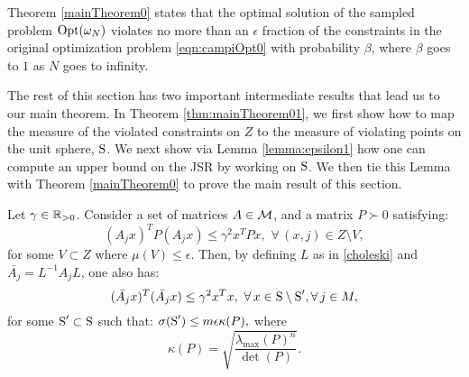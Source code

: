 Theorem \ref{mainTheorem0} states that the optimal solution of the sampled problem $\text{Opt}(\omega_N)$ violates no more than an $\epsilon$ fraction of the constraints in the original optimization problem  \eqref{eqn:campiOpt0} with probability $\beta$, where $\beta$ goes to $1$ as $N$ goes to infinity.

The rest of this section has two important intermediate results that lead us to our main theorem.  
In Theorem \ref{thm:mainTheorem01}, we first show how to map the measure of the violated constraints on $Z$ to the measure of violating points on the unit sphere, $\text{S}$. We next show via Lemma \ref{lemma:epsilon1} how one can compute an upper bound on the JSR by working on $\text{S}$. We then tie this Lemma with Theorem \ref{mainTheorem0} to prove the main result of this section. 

\begin{property}\label{thm:mainTheorem01}Let $\gamma \in \mathbb{R}_{> 0}$. Consider a set of matrices $A \in \mathcal{M}$, and a matrix $P \succ 0$ satisfying:
\begin{equation}\label{eqn:P}(A_j x)^TP(A_j x) \leq {\gamma}^2x^TPx,\,\, \forall\, (x, j) \in Z \setminus V,\end{equation}
for some $V \subset Z$ where $\mu(V) \leq \epsilon$. Then, by defining $L$ as in \eqref{choleski} and $\bar{A_j}=  L^{-1}A_jL$, one also has:
\begin{equation*}\label{eqn:thm01-2}(\bar{A_j} x)^T(\bar{A_j} x) \leq {\gamma}^2x^Tx,\,\, \forall\, x \in \text{S} \setminus \text{S}', \forall\, j \in M,\end{equation*}
for some $\text{S}' \subset \text{S}$ such that: $\sigma(\text{S}') \leq m\epsilon \kappa(P),$
where $$\kappa(P) = \sqrt{\frac{\lambda_{\max}(P)^n}{\det(P)}}.$$
\end{property}

